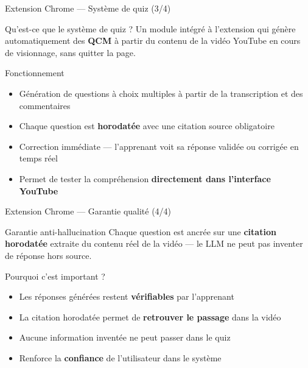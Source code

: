 \documentclass[aspectratio=169, 12pt]{beamer}
\begin{document}
\begin{frame}{Extension Chrome — Système de quiz (3/4)}

  \begin{block}{Qu'est-ce que le système de quiz ?}
    \normalsize
    Un module intégré à l'extension qui génère automatiquement des
    \textbf{QCM} à partir du contenu de la vidéo YouTube en cours de
    visionnage, sans quitter la page.
  \end{block}

  \vspace{0.4cm}

  \begin{exampleblock}{Fonctionnement}
    \begin{itemize}
      \item Génération de questions à choix multiples à partir de la transcription et des commentaires
      \item Chaque question est \textbf{horodatée} avec une citation source obligatoire
      \item Correction immédiate — l'apprenant voit sa réponse validée ou corrigée en temps réel
      \item Permet de tester la compréhension \textbf{directement dans l'interface YouTube}
    \end{itemize}
  \end{exampleblock}

\end{frame}

\begin{frame}{Extension Chrome — Garantie qualité (4/4)}

  \begin{alertblock}{Garantie anti-hallucination}
    \normalsize
    Chaque question est ancrée sur une \textbf{citation horodatée} extraite
    du contenu réel de la vidéo — le LLM ne peut pas inventer de réponse
    hors source.
  \end{alertblock}

  \vspace{0.5cm}

  \begin{block}{Pourquoi c'est important ?}
    \begin{itemize}
      \item Les réponses générées restent \textbf{vérifiables} par l'apprenant
      \item La citation horodatée permet de \textbf{retrouver le passage} dans la vidéo
      \item Aucune information inventée ne peut passer dans le quiz
      \item Renforce la \textbf{confiance} de l'utilisateur dans le système
    \end{itemize}
  \end{block}

\end{frame}
\end{document}
